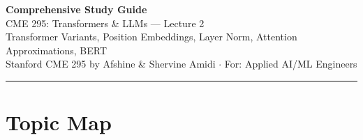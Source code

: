 \documentclass[11pt, a4paper]{article}
\begin{document}
\begin{center}
{\LARGE\bfseries\color{defblue} Comprehensive Study Guide}\\[6pt]
{\Large CME 295: Transformers \& LLMs --- Lecture 2}\\[4pt]
{\normalsize Transformer Variants, Position Embeddings, Layer Norm, Attention Approximations, BERT}\\[4pt]
{\small Stanford CME 295 by Afshine \& Shervine Amidi $\cdot$ For: Applied AI/ML Engineers}\\[2pt]
\rule{\textwidth}{0.4pt}
\end{center}

\tableofcontents
\newpage

\section{Topic Map}
\end{document}
